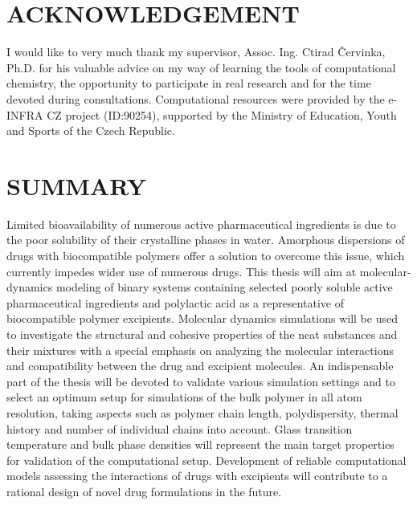 \newpage
 

%


\newpage
\thispagestyle{empty}

\vspace*{\fill}
\section*{ACKNOWLEDGEMENT}
\mbox
\indent I would like to very much thank my supervisor, Assoc. Ing. Ctirad Červinka, Ph.D. for his valuable advice on my way of learning the tools of computational chemistry, the opportunity to participate in real research and for the time devoted during consultations. Computational resources were provided by the e-INFRA CZ project (ID:90254), supported by the Ministry of Education, Youth and Sports of the Czech Republic.





\newpage
\thispagestyle{empty}

\section*{SUMMARY}
Limited bioavailability of numerous active pharmaceutical ingredients is due to the poor solubility of their crystalline phases in water. Amorphous dispersions of drugs with biocompatible polymers offer a solution to overcome this issue, which currently impedes wider use of numerous drugs. This thesis will aim at molecular-dynamics modeling of binary systems containing selected poorly soluble active pharmaceutical ingredients and polylactic acid as a representative of biocompatible polymer excipients. Molecular dynamics simulations will be used to investigate the structural and cohesive properties of the neat substances and their mixtures with a special emphasis on analyzing the molecular interactions and compatibility between the drug and excipient molecules. An indispensable part of the thesis will be devoted to validate various simulation settings and to select an optimum setup for simulations of the bulk polymer in all atom resolution, taking aspects such as polymer chain length, polydispersity, thermal history and number of individual chains into account. Glass transition temperature and bulk phase densities will represent the main target properties for validation of the computational setup. Development of reliable computational models assessing the interactions of drugs with excipients will contribute to a rational design of novel drug formulations in the future.


